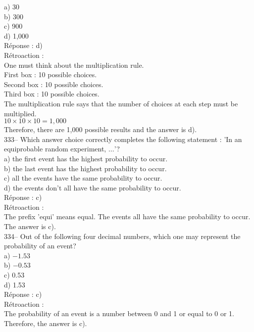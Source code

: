 \documentclass[letterpaper, 12pt]{article}
\begin{document}
a) 30\\
b) 300\\
c) 900\\
d) 1,000\\

R\'eponse : d)\\

R\'etroaction : \\
One must think about the multiplication rule.\\
First box : 10 possible choices.\\
Second box : 10 possible choices.\\
Third box : 10 possible choices.\\
The multiplication rule says that the number of choices at each step must be multiplied.\\
$10\times10\times10=1,000$\\
Therefore, there are 1,000 possible results and the answer is d).\\

333-- Which answer choice correctly completes the following statement : 'In an equiprobable random experiment,  $\ldots$'?\\

a) the first event has the highest probability to occur.\\
b) the last event has the highest probability to occur.\\
c) all the events have the same probability to occur.\\
d) the events don't all have the same probability to occur.\\

R\'eponse : c)\\

R\'etroaction : \\
The prefix 'equi' means equal. The events all have the same probability to occur. The answer is c).\\

334-- Out of the following four decimal numbers, which one may represent the probability of an event?\\

a) $-1.53$\\
b) $-0.53$\\
c) 0.53\\
d) 1.53\\

R\'eponse : c)\\

R\'etroaction : \\
The probability of an event is a number between 0 and 1 or
equal to 0 or 1. Therefore, the answer is c).\\
\end{document}
